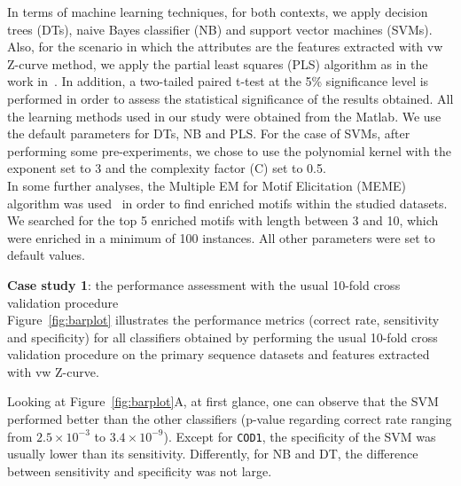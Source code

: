 \documentclass[conference,letterpaper]{IEEEtran}
\begin{document}
In terms of machine learning techniques, for both contexts, we apply decision trees (DTs), naive Bayes classifier (NB) and support vector machines (SVMs). Also, for the scenario in which the attributes are the features extracted with vw Z-curve method, we apply the partial least squares (PLS) algorithm as in the work in~\cite{song2011a}. In addition, a two-tailed paired t-test at the 5\% significance level is performed in order to assess the statistical significance of the results obtained. All the learning methods used in our study were obtained from the Matlab. We use the default parameters for DTs, NB and PLS. For the case of SVMs, after performing some pre-experiments, we chose to use the polynomial kernel with the exponent set to 3 and the complexity factor (C) set to 0.5. \\

In some further analyses, the Multiple EM for Motif Elicitation (MEME) algorithm was used~\cite{bailey2009} in order to find enriched motifs within the studied datasets. We searched for the top 5 enriched motifs with length between 3 and 10, which were enriched in a minimum of 100 instances. All other parameters were set to default values.

\noindent
{\bf Case study 1}: the performance assessment with the usual 10-fold cross validation procedure \\

Figure~\ref{fig:barplot} illustrates the performance metrics (correct rate, sensitivity and specificity) for all classifiers obtained by performing the usual 10-fold cross validation procedure on the primary sequence datasets and features extracted with vw Z-curve.

Looking at Figure~\ref{fig:barplot}A, at first glance, one can observe that the SVM performed better than the other classifiers (p-value regarding correct rate ranging from $2.5\times10^{-3}$ to $3.4\times10^{-9}$). Except for {\tt COD1}, the specificity of the SVM  was usually lower than its sensitivity. Differently, for NB and DT, the difference between sensitivity and specificity was not large.
\end{document}

